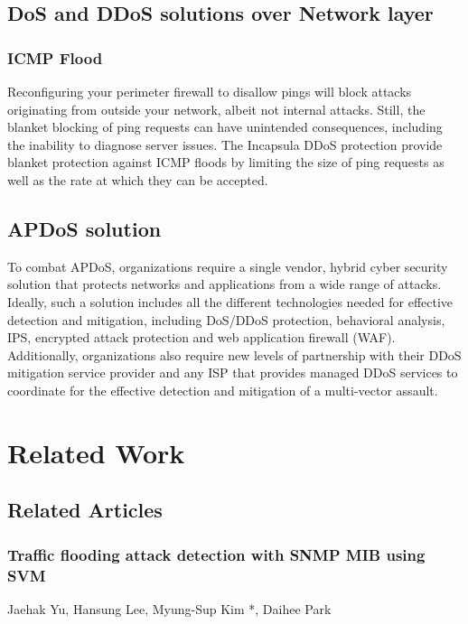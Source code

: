 \documentclass{report}
\begin{document}
\section {DoS and DDoS solutions over Network layer} 

\subsection {ICMP Flood} Reconfiguring your perimeter firewall to disallow pings will block attacks originating from outside your network, albeit not internal attacks. Still, the blanket blocking of ping requests can have unintended consequences, including the inability to diagnose server issues.
The Incapsula DDoS protection provide blanket protection against ICMP floods by limiting the size of ping requests as well as the rate at which they can be accepted.

 \hfill \break

\section {APDoS solution}

 \hfill \break To combat APDoS, organizations require a single vendor, hybrid cyber security solution that protects networks and applications from a wide range of attacks. Ideally, such a solution includes all the different technologies needed for effective detection and mitigation, including DoS/DDoS protection, behavioral analysis, IPS, encrypted attack protection and web application firewall (WAF). Additionally, organizations also require new levels of partnership with their DDoS mitigation service provider and any ISP that provides managed DDoS services to coordinate for the effective detection and mitigation of a multi-vector assault.

\newpage
\chapter {Related Work}
\section {Related Articles}
\subsection {Traffic flooding attack detection with SNMP MIB using SVM}
 {\footnotesize  Jaehak Yu, Hansung Lee, Myung-Sup Kim *, Daihee Park}
\end{document}
